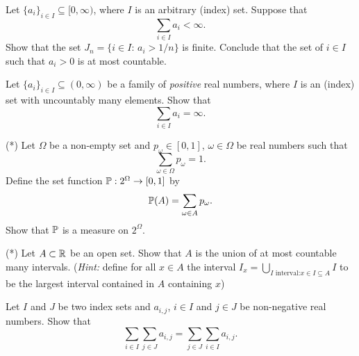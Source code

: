 \begin{problem} Let $\{a_i\}_{i\in I} \subseteq [0,\infty)$, where $I$ is an arbitrary (index) set. Suppose that
    \begin{equation*}
        \sum_{i\in I} a_i < \infty.
    \end{equation*}
Show that the set $J_n = \{i\in I:\, a_i>1/n\}$ is finite. Conclude that the set of $i\in I$ such that $a_i>0$ is at most countable. 
\end{problem}

\begin{problem} Let $\{a_i\}_{i\in I} \subseteq (0,\infty)$ be a family of \emph{positive} real numbers, where $I$ is an (index) set with uncountably many elements.
Show that
 \begin{equation*}
     \sum_{i\in I} a_i = \infty.
 \end{equation*}
\end{problem}

\begin{problem} (*) Let $\Omega$ be a non-empty set and $p_\omega\in [0,1]$, $\omega\in \Omega$ be real numbers such that 
\begin{equation*}
    \sum_{\omega\in \Omega} p_\omega = 1.
\end{equation*}    
Define the set function $\mathbb P:2^\Omega \to [0,1]$ by
\begin{equation*}
    \mathbb P(A) = \sum_{\omega\in A} p_\omega.
\end{equation*}    
Show that $\mathbb P$ is a measure on $2^\Omega$.
\end{problem}

\begin{problem} (*)
    Let $A\subset \mathbb R$ be an open set. Show that $A$ is the union of at most countable many intervals. (\emph{Hint:} define for all $x\in A$ the interval $I_x = \bigcup_{\text{$I$ interval:} x\in I \subseteq A} I$ to be the largest interval contained in $A$ containing $x$)
\end{problem}

\begin{problem}
    Let $I$ and $J$ be two index sets and $a_{i,j}$, $i\in I$ and $j\in J$ be non-negative real numbers. Show that 
    \begin{equation*}
        \sum_{i\in I} \sum_{j\in J} a_{i,j} = \sum_{j\in J} \sum_{i\in I} a_{i,j}. 
    \end{equation*}
\end{problem}

